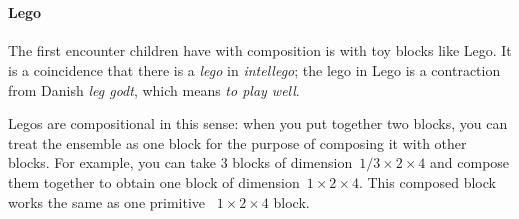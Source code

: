 

\section{}

\paragraph{Lego}

The first encounter children have with composition is with toy blocks like Lego. It is a coincidence that there is a \emph{lego} in \emph{intellego}; the lego in Lego is a contraction from Danish \emph{leg godt}, which means \emph{to play well}.

Legos are compositional in this sense: when you put together two blocks, you can treat the ensemble as one block for the purpose of composing it with other blocks. For example, you can take 3 blocks of dimension~$1/3 \times 2 \times 4$ and compose them together to obtain one block of dimension~$1 \times 2 \times 4$. This composed block works the same as one primitive ~$1 \times 2 \times 4 $ block.
